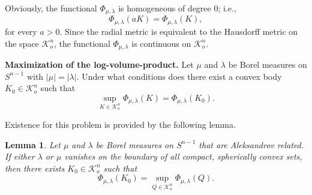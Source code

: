 \documentclass{cpamart1}     %
\newtheorem{lemm}[theo]{Lemma}
\theoremstyle{definition}
\theoremstyle{remark}
\newcommand{\sn}{S^{n-1}}
\newcommand{\kno}{\mathcal K^n_o}
\begin{document}
Obviously, the functional $\Phi_{\mu, \lambda}$ is homogeneous of degree 0; i.e.,
\[
\Phi_{\mu,\lambda}(aK) = \Phi_{\mu,\lambda}(K),
\]
for every $a>0$.
Since the radial metric is equivalent to the Hausdorff metric on the space
$\kno$, the functional $\Phi_{\mu, \lambda}$ is continuous on $\kno$.

\medskip

\noindent
{\bf Maximization of the log-volume-product.}
Let $\mu$ and $\lambda$ be Borel measures on $\sn$ with $|\mu|=|\lambda|$.
Under what conditions does there exist a convex body $K_0\in\kno$
such that
\begin{equation*}
\sup_{K \in \kno} \Phi_{\mu, \lambda}(K) = \Phi_{\mu, \lambda}(K_0).
\end{equation*}

Existence for this problem is provided by the following lemma.


\begin{lemm}\label{e1.1}
Let $\mu$ and $\lambda$ be Borel measures on $\sn$ that are Aleksandrov related.
If either $\lambda$ or $\mu$ vanishes on the boundary
of all compact, spherically convex sets,
then there exists $K_0\in \mathcal{K}_o^n$ such that
\begin{equation*}
\Phi_{\mu,\lambda}(K_0)= \sup_{Q\in \mathcal{K}_o^n} \Phi_{\mu,\lambda}(Q).
\end{equation*}
\end{lemm}
\end{document}
